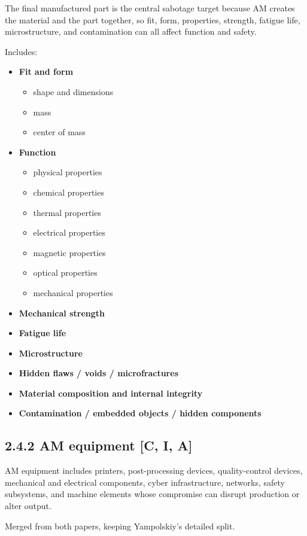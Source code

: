 \documentclass[10pt,a4paper,oneside]{report}
\begin{document}
The final manufactured part is the central sabotage target because AM creates the material and the part together, so fit, form, properties, strength, fatigue life, microstructure, and contamination can all affect function and safety.

Includes:

\begin{itemize}
\item \textbf{Fit and form}
\begin{itemize}
\item shape and dimensions
\item mass
\item center of mass
\end{itemize}
\item \textbf{Function}
\begin{itemize}
\item physical properties
\item chemical properties
\item thermal properties
\item electrical properties
\item magnetic properties
\item optical properties
\item mechanical properties
\end{itemize}
\item \textbf{Mechanical strength}
\item \textbf{Fatigue life}
\item \textbf{Microstructure}
\item \textbf{Hidden flaws / voids / microfractures}
\item \textbf{Material composition and internal integrity}
\item \textbf{Contamination / embedded objects / hidden components}
\end{itemize}


\subsection{2.4.2 AM equipment [C, I, A]}


AM equipment includes printers, post-processing devices, quality-control devices, mechanical and electrical components, cyber infrastructure, networks, safety subsystems, and machine elements whose compromise can disrupt production or alter output.

Merged from both papers, keeping Yampolskiy's detailed split.
\end{document}
